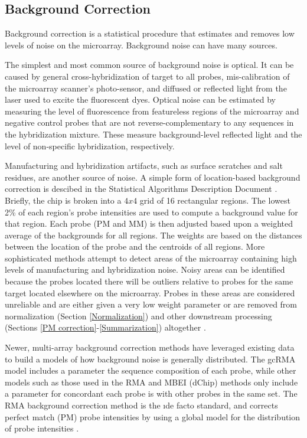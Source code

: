 \subsection{Background Correction}\label{Background Correction}

Background correction is a statistical procedure that estimates and removes low
levels of noise on the microarray.  Background noise can have many sources.

The simplest and most common source of background noise is optical.  It can be
caused by general cross-hybridization of target to all probes, mis-calibration
of the microarray scanner's photo-sensor, and diffused or reflected light from
the laser used to excite the fluorescent dyes.  Optical noise can be estimated
by measuring the level of fluorescence from featureless regions of the
microarray and negative control probes that are not reverse-complementary to
any sequences in the hybridization mixture.  These measure background-level
reflected light and the level of non-specific hybridization, respectively.

Manufacturing and hybridization artifacts, such as surface scratches and salt
residues, are another source of noise.  A simple form of location-based
background correction is descibed in the Statistical Algorithms Description
Document \cite{affy:tech:2002}.   Briefly, the chip is broken into a $4x4$
grid of 16 rectangular regions.  The lowest 2\% of each region's probe
intensities are used to compute a background value for that region.  Each probe
(PM and MM) is then adjusted based upon a weighted average of the backgrounds
for all regions. The weights are based on the distances between the location of
the probe and the centroids of all regions.  More sophisticated methods attempt
to detect areas of the microarray containing high levels of manufacturing and
hybridization noise.  Noisy areas can be identified because the probes located
there will be outliers relative to probes for the same target located elsewhere
on the microarray.  Probes in these areas are considered unreliable and are
either given a very low weight parameter or are removed from normalization
(Section \ref{Normalization}) and other downstream processing (Sections \ref{PM
correction}-\ref{Summarization}) altogether \cite{affyplm}.

Newer, multi-array background correction methods have leveraged existing data
to build a models of how background noise is generally distributed.  The gcRMA
model \cite{gcrma} includes a parameter the sequence composition of each probe,
while other models such as those used in the RMA and MBEI (dChip)
\cite{rma,mbei,dchip,vsn,bioc} methods only include a parameter for concordant
each probe is with other probes in the same set.  The RMA background correction
method is the \i{de facto} standard, and corrects perfect match (PM) probe
intensities by using a global model for the distribution of probe intensities
\cite{rma,gautier}.

